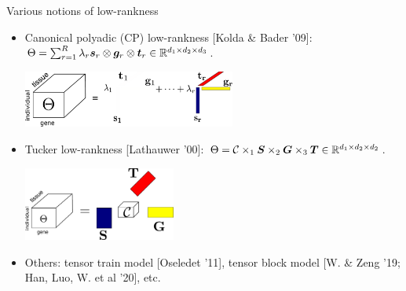 \documentclass[10pt, mathserif]{beamer} %
\theoremstyle{definition}
\theoremstyle{plain}
\begin{document}
\begin{frame}{Various notions of low-rankness}
\begin{itemize}
\item Canonical polyadic (CP) low-rankness {\scriptsize[Kolda \& Bader '09]}: $\Theta=\sum_{r=1}^R\lambda_r\bm{s}_r\otimes \bm{g}_r\otimes \bm{t}_r \in\mathbb{R}^{d_1\times d_2\times d_3}$.

\vspace{.3cm}
\centerline{\includegraphics[width=7cm]{Figures/CP_decomp2.pdf}}

\item Tucker low-rankness {\scriptsize[Lathauwer '00]}: $\Theta=\mathcal{C}\times_1\bm S\times_2 \bm G\times_3\bm T\in\mathbb{R}^{d_1\times d_2\times d_2}$.

\vspace{.5cm}
\centerline{\includegraphics[width=5cm]{Figures/HOSVD.pdf}}
\item Others: tensor train model {\scriptsize[Oseledet '11]}, tensor block model {\scriptsize[W. \& Zeng '19; Han, Luo, W. et al '20]}, etc.
\end{itemize}
\end{frame}




\end{document}
